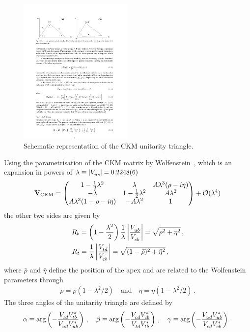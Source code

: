 \begin{figure}[htb]
\centering
\includegraphics[width=0.5\textwidth]{03-CPViolation/figs/CKMtriangle_prelim.pdf}
\caption{Schematic representation of the CKM unitarity triangle.}
\label{fig:cpviolation:ckmtriangle}
\end{figure}
Using the parametrisation of the CKM matrix by
Wolfenstein~\cite{Wolfenstein:1983yz}, which is an expansion in powers of
$\lambda \equiv |\Vus| = \num{0.2248\pm0.0006}$~\cite{PDG2016}
\begin{align}
\matr{V}_{\text{CKM}} = 
\begin{pmatrix}
1 - \frac 12 \lambda^2 & \lambda & A\lambda^3(\rho - i\eta) \\
- \lambda & 1 - \frac 12 \lambda^2 & A\lambda^2 \\	
A\lambda^3(1 - \rho - i\eta) & -A\lambda^2 & 1
\end{pmatrix}
+ \mathcal{O}(\lambda^4)
\end{align}
the other two sides are given by
\begin{align}
	R_b &= \left(1 - \frac{\lambda^2}2\right)\frac 1\lambda \left|\frac \Vub\Vcb\right| = \sqrt{\bar{\rho}^2 + \bar{\eta}^2}\,,\\
	R_t &= \frac 1\lambda \left|\frac \Vtd\Vcb\right| = \sqrt{(1 - \bar{\rho})^2 + \bar{\eta}^2}\,,
\end{align}
where $\bar{\rho}$ and $\bar{\eta}$ define the position of the apex and are
related to the Wolfenstein parameters through
\begin{align}
	\bar{\rho} = \rho(1 - \lambda^2/2)\quad \text{and} \quad \bar{\eta} = \eta(1 - \lambda^2/2)\,.
\end{align}
The three angles of the unitarity triangle are defined by
\begin{align}
	\alpha \equiv \text{arg}\left(-\frac{\Vtd\Vtbs}{\Vud\Vubs}\right)\,,\quad
	\beta \equiv \text{arg}\left(-\frac{\Vcd\Vcbs}{\Vtd\Vtbs}\right)\,,\quad
	\gamma \equiv \text{arg}\left(-\frac{\Vud\Vubs}{\Vcd\Vcbs}\right)\,.
\end{align}

